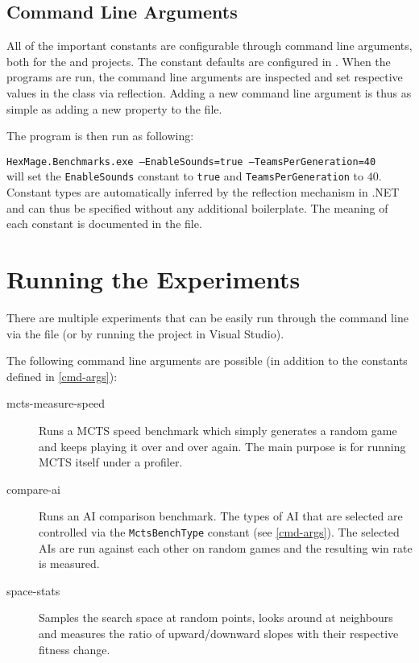 \subsection{Command Line Arguments}
\label{cmd-args}

All of the important constants are configurable through command line arguments, both for the  and  projects. The constant defaults are configured in . When the programs are run, the command line arguments are inspected and set respective values in the  class via reflection. Adding a new command line argument is thus as simple as adding a new property to the  file.

The program is then run as following:

\vspace{.5cm}
\texttt{HexMage.Benchmarks.exe --EnableSounds=true --TeamsPerGeneration=40}
\\

will set the \verb|EnableSounds| constant to \verb|true| and \verb|TeamsPerGeneration| to $40$. Constant types are automatically inferred by the reflection mechanism in .NET and can thus be specified without any additional boilerplate. The meaning of each constant is documented in the  file. 

\section{Running the Experiments}

There are multiple experiments that can be easily run through the command line via the  file (or by running the  project in Visual Studio).

The following command line arguments are possible (in addition to the constants defined in \autoref{cmd-args}):

\begin{description}
	\item[mcts-measure-speed] Runs a MCTS speed benchmark which simply generates a random game and keeps playing it over and over again. The main purpose is for running MCTS itself under a profiler.
	
	\item[compare-ai] Runs an AI comparison benchmark. The types of AI that are selected are controlled via the \verb|MctsBenchType| constant (see \autoref{cmd-args}). The selected AIs are run against each other on random games and the resulting win rate is measured.
	
	\item[space-stats] Samples the search space at random points, looks around at neighbours and measures the ratio of upward/downward slopes with their respective fitness change.
	
\end{description}

